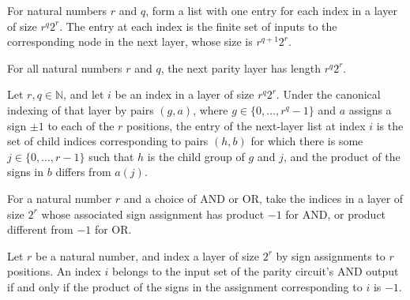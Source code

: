 \begin{definition}
\label{FABL.parityNextLayer}
\leanok
{}
For natural numbers $r$ and $q$, form a list with one entry for each index in a layer of
size $r^q2^r$. The entry at each index is the finite set of inputs to the corresponding
node in the next layer, whose size is $r^{q+1}2^r$.
\end{definition}

\begin{theorem}
\label{FABL.length_parityNextLayer}
\leanok
{}
For all natural numbers $r$ and $q$, the next parity layer has length $r^q 2^r$.
\end{theorem}

\begin{theorem}
\label{FABL.get_parityNextLayer}
\leanok
{}
Let $r,q\in\mathbb N$, and let $i$ be an index in a layer of size $r^q2^r$. Under the
canonical indexing of that layer by pairs $(g,a)$, where $g\in\{0,\ldots,r^q-1\}$ and
$a$ assigns a sign $\pm1$ to each of the $r$ positions, the entry of the next-layer list
at index $i$ is the set of child indices corresponding to pairs $(h,b)$ for which there
is some $j\in\{0,\ldots,r-1\}$ such that $h$ is the child group of $g$ and $j$, and the
product of the signs in $b$ differs from $a(j)$.
\end{theorem}

\begin{definition}
\label{FABL.parityOutputInputs}
\leanok
{}
For a natural number $r$ and a choice of AND or OR, take the indices in a layer of size
$2^r$ whose associated sign assignment has product $-1$ for AND, or product different
from $-1$ for OR.
\end{definition}

\begin{theorem}
\label{FABL.mem_parityOutputInputs_and_iff}
\leanok
{}
Let $r$ be a natural number, and index a layer of size $2^r$ by sign assignments to $r$
positions. An index $i$ belongs to the input set of the parity circuit's AND output if
and only if the product of the signs in the assignment corresponding to $i$ is $-1$.
\end{theorem}

